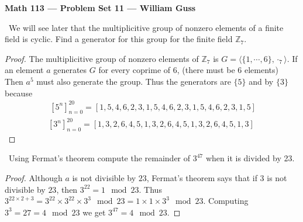 \documentclass[11pt]{amsart}
\begin{document}
\begin{center}{\bf Math 113 --- Problem Set 11 --- William Guss} \end{center}


\bigskip


\medskip {}\ We will see later that the multiplicitive group of nonzero elements of a finite field is cyclic. Find a generator for this group for the finite field $\mathbb{Z}_7.$
\begin{proof}
	The multiplicitive group of nonzero elements of $\mathbb{Z}_7$ is $G = \langle \{1, \cdots, 6\}, \cdot_7\rangle$. If an element $a$ generates $G$ for every coprime of $6$, (there must be $6$ elements) Then $a^5$ must also generate the group. Thus the generators are $\{5\}$ and by $\{3\}$
	because
	\begin{equation*}
	\begin{aligned}
		\ [{5^n}]_{n=0}^{20} = [1, 5, 4, 6, 2, 3, 1, 5, 4, 6, 2, 3, 1, 5, 4, 6, 2, 3, 1, 5]\\
		[3^n]_{n=0}^{20} = [1, 3, 2, 6, 4, 5, 1, 3, 2, 6, 4, 5, 1, 3, 2, 6, 4, 5, 1, 3]
	\end{aligned}
	\end{equation*}	


\end{proof}
\medskip {}\ Using Fermat's theorem compute the remainder of $3^{47}$ when it is divided by 23.
\begin{proof}
	Although $a$ is not divisible by $23$, Fermat's theorem says that if $3$ is not divisible by $23$, then $3^{22}= 1 \mod 23$.
	Thus $3^{22\times2 +3} = 3^{22}\times 3^{22} \times 3^3 \mod 23 = 1 \times 1 \times 3 ^ 3 \mod 23.$ Computing $3^3 = 27 = 4 \mod 23$ we get $3^{47} = 4 \mod 23.$
\end{proof}
\end{document}
